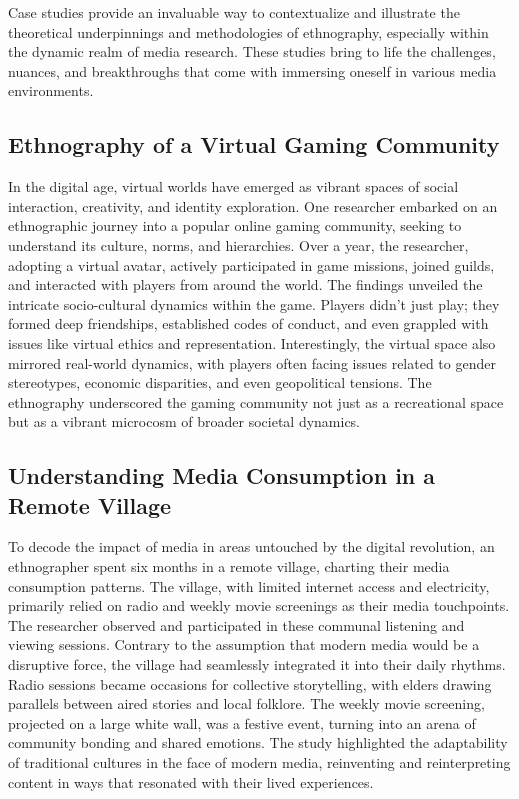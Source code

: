 \documentclass[
  b5paper]{book}
\begin{document}
Case studies provide an invaluable way to contextualize and illustrate the theoretical underpinnings and methodologies of ethnography, especially within the dynamic realm of media research. These studies bring to life the challenges, nuances, and breakthroughs that come with immersing oneself in various media environments.

\hypertarget{ethnography-of-a-virtual-gaming-community}{%
\subsection*{Ethnography of a Virtual Gaming Community}\label{ethnography-of-a-virtual-gaming-community}}

In the digital age, virtual worlds have emerged as vibrant spaces of social interaction, creativity, and identity exploration. One researcher embarked on an ethnographic journey into a popular online gaming community, seeking to understand its culture, norms, and hierarchies. Over a year, the researcher, adopting a virtual avatar, actively participated in game missions, joined guilds, and interacted with players from around the world. The findings unveiled the intricate socio-cultural dynamics within the game. Players didn't just play; they formed deep friendships, established codes of conduct, and even grappled with issues like virtual ethics and representation. Interestingly, the virtual space also mirrored real-world dynamics, with players often facing issues related to gender stereotypes, economic disparities, and even geopolitical tensions. The ethnography underscored the gaming community not just as a recreational space but as a vibrant microcosm of broader societal dynamics.

\hypertarget{understanding-media-consumption-in-a-remote-village}{%
\subsection*{Understanding Media Consumption in a Remote Village}\label{understanding-media-consumption-in-a-remote-village}}

To decode the impact of media in areas untouched by the digital revolution, an ethnographer spent six months in a remote village, charting their media consumption patterns. The village, with limited internet access and electricity, primarily relied on radio and weekly movie screenings as their media touchpoints. The researcher observed and participated in these communal listening and viewing sessions. Contrary to the assumption that modern media would be a disruptive force, the village had seamlessly integrated it into their daily rhythms. Radio sessions became occasions for collective storytelling, with elders drawing parallels between aired stories and local folklore. The weekly movie screening, projected on a large white wall, was a festive event, turning into an arena of community bonding and shared emotions. The study highlighted the adaptability of traditional cultures in the face of modern media, reinventing and reinterpreting content in ways that resonated with their lived experiences.
\end{document}
